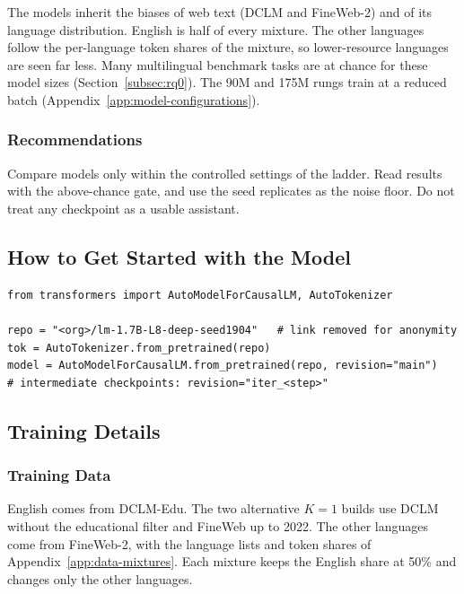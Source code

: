The models inherit the biases of web text (DCLM and FineWeb-2) and of its language distribution. English is half of every mixture. The other languages follow the per-language token shares of the mixture, so lower-resource languages are seen far less. Many multilingual benchmark tasks are at chance for these model sizes (Section~\ref{subsec:rq0}). The 90M and 175M rungs train at a reduced batch (Appendix~\ref{app:model-configurations}).

\subsubsection*{Recommendations}

Compare models only within the controlled settings of the ladder. Read results with the above-chance gate, and use the seed replicates as the noise floor. Do not treat any checkpoint as a usable assistant.

\subsection*{How to Get Started with the Model}

\begin{small}
\begin{verbatim}
from transformers import AutoModelForCausalLM, AutoTokenizer

repo = "<org>/lm-1.7B-L8-deep-seed1904"   # link removed for anonymity
tok = AutoTokenizer.from_pretrained(repo)
model = AutoModelForCausalLM.from_pretrained(repo, revision="main")
# intermediate checkpoints: revision="iter_<step>"
\end{verbatim}
\end{small}

\subsection*{Training Details}

\subsubsection*{Training Data}

English comes from DCLM-Edu. The two alternative $K = 1$ builds use DCLM without the educational filter and FineWeb up to 2022. The other languages come from FineWeb-2, with the language lists and token shares of Appendix~\ref{app:data-mixtures}. Each mixture keeps the English share at 50\% and changes only the other languages.

